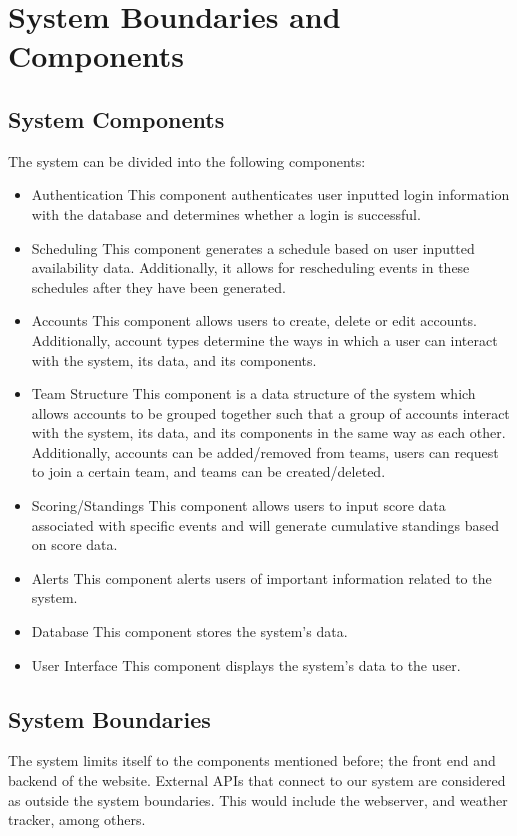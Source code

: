 \documentclass{article}
\begin{document}
\section{System Boundaries and Components}

\subsection{System Components}
The system can be divided into the following components:
\begin{itemize}
    \item Authentication
    \subitem This component authenticates user inputted login information with the database
    and determines whether a login is successful.
    \item Scheduling
    \subitem This component generates a schedule based on user inputted availability data. 
    Additionally, it allows for rescheduling events in these schedules after they 
    have been generated.
    \item Accounts
    \subitem This component allows users to create, delete or edit accounts. Additionally, account types 
    determine the ways in which a user can interact with the system, its data, and its components.
    \item Team Structure
    \subitem This component is a data structure of the system which allows accounts to be grouped together 
    such that a group of accounts interact with the system, its data, and its components in the same way as 
    each other. Additionally, accounts can be added/removed from teams, users can request to join a 
    certain team, and teams can be created/deleted.
    \item Scoring/Standings
    \subitem This component allows users to input score data associated with specific events and will 
    generate cumulative standings based on score data.
    \item Alerts
    \subitem This component alerts users of important information related to the system.
    \item Database
    \subitem This component stores the system's data.
    \item User Interface
    \subitem This component displays the system's data to the user.
\end{itemize}

\subsection{System Boundaries}
The system limits itself to the components mentioned before; the front end and backend of the website.
External APIs that connect to our system are considered as outside the system boundaries.
This would include the webserver, and weather tracker, among others. 
\end{document}
